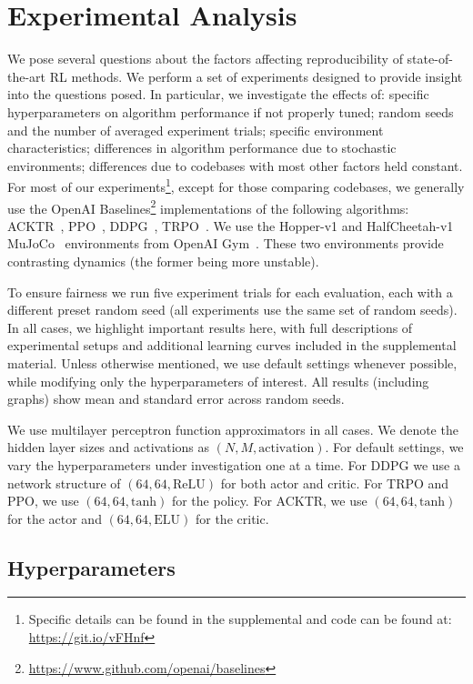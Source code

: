 \documentclass[letterpaper]{article} %
\begin{document}
\section{Experimental Analysis}
\label{sec:experimental_analysis}
We pose several questions about the factors affecting reproducibility of state-of-the-art RL methods. We perform a set of experiments designed to provide insight into the questions posed. In particular, we investigate the effects of: specific hyperparameters on algorithm performance if not properly tuned; random seeds and the number of averaged experiment trials; specific environment characteristics; differences in algorithm performance due to stochastic environments; differences due to codebases with most other factors held constant. For most of our experiments\footnote{Specific details can be found in the supplemental and code can be found at: \url{https://git.io/vFHnf}}, except for those comparing codebases, we generally use the OpenAI Baselines\footnote{\url{https://www.github.com/openai/baselines}} implementations of the following algorithms: ACKTR~\cite{ACKTR}, PPO~\cite{PPO}, DDPG~\cite{plappert2017parameter}, TRPO~\cite{PPO}. We use the Hopper-v1 and HalfCheetah-v1 MuJoCo~\cite{MuJoCo} environments from OpenAI Gym~\cite{gym}. These two environments provide contrasting dynamics (the former being more unstable).

To ensure fairness we run five experiment trials for each evaluation, each with a different preset random seed (all experiments use the same set of random seeds). In all cases, we highlight important results here, with full descriptions of experimental setups and additional learning curves included in the supplemental material. Unless otherwise mentioned, we use default settings whenever possible, while modifying only the hyperparameters of interest. All results (including graphs) show mean and standard error across random seeds.

We use multilayer perceptron function approximators in all cases. We denote the hidden layer sizes and activations as $(N, M, \text{activation})$. For default settings, we vary the hyperparameters under investigation one at a time. For DDPG we use a network structure of $(64, 64, \text{ReLU})$ for both actor and critic. For TRPO and PPO, we use $(64, 64, \text{tanh})$ for the policy. For ACKTR, we use $(64, 64, \text{tanh})$ for the actor and $(64, 64, \text{ELU})$ for the critic.

\subsection{Hyperparameters}
\end{document}
